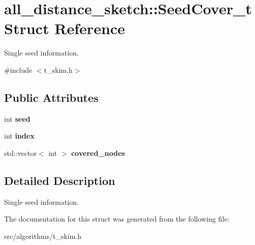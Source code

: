 \hypertarget{structall__distance__sketch_1_1SeedCover__t}{}\section{all\+\_\+distance\+\_\+sketch\+:\+:Seed\+Cover\+\_\+t Struct Reference}
\label{structall__distance__sketch_1_1SeedCover__t}


Single seed information.  




{\ttfamily \#include $<$t\+\_\+skim.\+h$>$}

\subsection*{Public Attributes}
\begin{DoxyCompactItemize}
\item 
\hypertarget{structall__distance__sketch_1_1SeedCover__t_af8100e6ff9b3830e0b40e395cbaeff4b}{}int {\bfseries seed}\label{structall__distance__sketch_1_1SeedCover__t_af8100e6ff9b3830e0b40e395cbaeff4b}

\item 
\hypertarget{structall__distance__sketch_1_1SeedCover__t_ac11aa27c1be296bb17310c16790f88f5}{}int {\bfseries index}\label{structall__distance__sketch_1_1SeedCover__t_ac11aa27c1be296bb17310c16790f88f5}

\item 
\hypertarget{structall__distance__sketch_1_1SeedCover__t_aec4575ff1b61bc5684301089db0acbe7}{}std\+::vector$<$ int $>$ {\bfseries covered\+\_\+nodes}\label{structall__distance__sketch_1_1SeedCover__t_aec4575ff1b61bc5684301089db0acbe7}

\end{DoxyCompactItemize}


\subsection{Detailed Description}
Single seed information. 

The documentation for this struct was generated from the following file\+:\begin{DoxyCompactItemize}
\item 
src/algorithms/t\+\_\+skim.\+h\end{DoxyCompactItemize}
